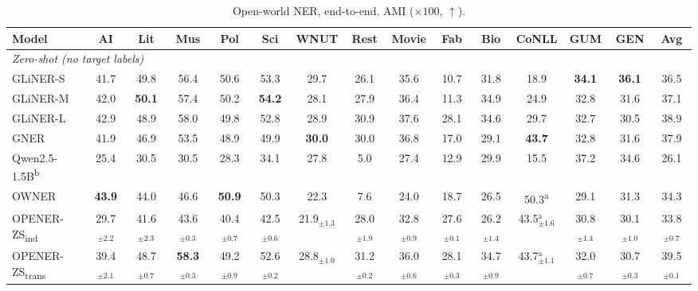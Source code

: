\documentclass[pdflatex,sn-basic,Numbered]{sn-jnl}
\newcommand{\zstr}{OPENER-ZS\textsubscript{trans}}
\newcommand{\zsind}{OPENER-ZS\textsubscript{ind}}
\begin{document}
\begin{table}[p]
\centering
\caption{Open-world NER, end-to-end. AMI ($\times 100$, $\uparrow$).}
\label{tab:main}
\scriptsize
\setlength{\tabcolsep}{2.5pt}
\begin{adjustbox}{max width=\textwidth}
\begin{threeparttable}
\begin{tabular}{l*{13}{c}c}
\toprule
Model & AI & Lit & Mus & Pol & Sci & WNUT & Rest & Movie & Fab & Bio & CoNLL & GUM & GEN & Avg \\
\midrule
\multicolumn{15}{l}{\emph{Zero-shot (no target labels)}} \\
GLiNER-S & 41.7 & 49.8 & 56.4 & 50.6 & 53.3 & 29.7 & 26.1 & 35.6 & 10.7 & 31.8 & 18.9 & \textbf{34.1} & \textbf{36.1} & 36.5 \\
GLiNER-M & 42.0 & \textbf{50.1} & 57.4 & 50.2 & \textbf{54.2} & 28.1 & 27.9 & 36.4 & 11.3 & 34.9 & 24.9 & 32.8 & 31.6 & 37.1 \\
GLiNER-L & 42.9 & 48.9 & 58.0 & 49.8 & 52.8 & 28.9 & 30.9 & 37.6 & 28.1 & 34.6 & 29.7 & 32.7 & 30.5 & 38.9 \\
GNER & 41.9 & 46.9 & 53.5 & 48.9 & 49.9 & \textbf{30.0} & 30.0 & 36.8 & 17.0 & 29.1 & \textbf{43.7} & 32.8 & 31.6 & 37.9 \\
Qwen2.5-1.5B\textsuperscript{b} & 25.4 & 30.5 & 30.5 & 28.3 & 34.1 & 27.8 & 5.0 & 27.4 & 12.9 & 29.9 & 15.5 & 37.2 & 34.6 & 26.1 \\
OWNER & \textbf{43.9} & 44.0 & 46.6 & \textbf{50.9} & 50.3 & 22.3 & 7.6 & 24.0 & 18.7 & 26.5 & 50.3\textsuperscript{a} & 29.1 & 31.3 & 34.3 \\
\zsind & 29.7$_{\pm2.2}$ & 41.6$_{\pm2.3}$ & 43.6$_{\pm0.3}$ & 40.4$_{\pm0.7}$ & 42.5$_{\pm0.6}$ & 21.9$_{\pm1.3}$ & 28.0$_{\pm1.9}$ & 32.8$_{\pm0.9}$ & 27.6$_{\pm0.1}$ & 26.2$_{\pm1.4}$ & 43.5$_{\pm1.6}^{\text{a}}$ & 30.8$_{\pm1.4}$ & 30.1$_{\pm1.0}$ & 33.8$_{\pm0.7}$ \\
\rowcolor{hlyellow} \zstr & 39.4$_{\pm2.1}$ & 48.7$_{\pm0.7}$ & \textbf{58.3$_{\pm0.3}$} & 49.2$_{\pm0.9}$ & 52.6$_{\pm0.2}$ & 28.8$_{\pm1.0}$ & 31.2$_{\pm0.2}$ & 36.0$_{\pm0.6}$ & 28.1$_{\pm0.3}$ & 34.7$_{\pm0.9}$ & 43.7$_{\pm1.1}^{\text{a}}$ & 32.0$_{\pm0.7}$ & 30.7$_{\pm0.3}$ & 39.5$_{\pm0.1}$ \\

\end{tabular}
\end{threeparttable}
\end{adjustbox}
\end{table}
\end{document}
